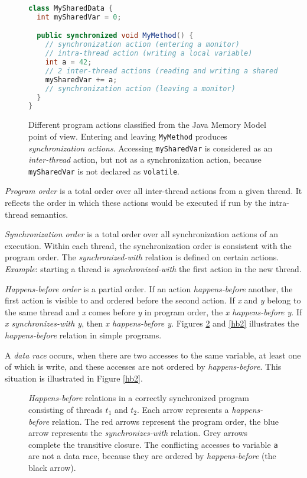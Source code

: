 \begin{figure}[hbt]
    \label{threadActions}
\begin{lstlisting}[language=java]
class MySharedData {
  int mySharedVar = 0;

  public synchronized void MyMethod() {
    // synchronization action (entering a monitor)
    // intra-thread action (writing a local variable)
    int a = 42;
    // 2 inter-thread actions (reading and writing a shared variable)
    mySharedVar += a;
    // synchronization action (leaving a monitor)
  }
}
\end{lstlisting}
    \caption{Different program actions classified from the Java Memory Model
    point of view. Entering and leaving \texttt{MyMethod} produces
    \emph{synchronization actions}. Accessing \texttt{mySharedVar} is considered
    as an \emph{inter-thread} action, but not as a synchronization action,
    because \texttt{mySharedVar} is not declared as \texttt{volatile}.}
\end{figure}


\emph{Program order} is a total order over all inter-thread actions from a given
thread. It reflects the order in which these actions would be executed if
run by the intra-thread semantics.

\emph{Synchronization order} is a total order over all synchronization actions
of an execution. Within each thread, the synchronization order is consistent
with the program order. The \emph{synchronized-with} relation is defined on
certain actions. \emph{Example}: starting a thread is \emph{synchronized-with}
the first action in the new thread.

\emph{Happens-before order} is a partial order. If an action
\emph{happens-before} another, the first action is visible to and ordered before
the second action. If \emph{x} and \emph{y} belong to the same thread and
\emph{x} comes before \emph{y} in program order, the \emph{x happens-before y}.
If \emph{x synchronizes-with y}, then \emph{x happens-before y}. Figures
\ref{hb1} and \ref{hb2} illustrates the \emph{happens-before} relation in simple
programs.

A \emph{data race} occurs, when there are two accesses to the same variable, at
least one of which is write, and these accesses are not ordered by
\emph{happens-before}. This situation is illustrated in Figure \ref{hb2}.

\begin{figure}[hbt]
    \label{hb1}
    
    \caption{\emph{Happens-before} relations in a correctly synchronized program
    consisting of threads $t_1$ and $t_2$. Each arrow represents a
    \emph{happens-before} relation. The red arrows represent the program order,
    the blue arrow represents the \emph{synchronizes-with} relation. Grey arrows
    complete the transitive closure. The conflicting accesses to variable
    \texttt{a} are not a data race, because they are ordered by
    \emph{happens-before} (the black arrow).}
\end{figure}


